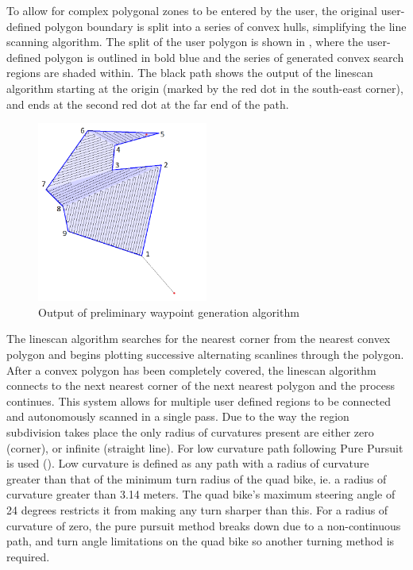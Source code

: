 \documentclass[main.tex]{subfiles}
\begin{document}
To allow for complex polygonal zones to be entered by the user, the original user-defined polygon boundary is split into a series of convex hulls, simplifying the line scanning algorithm. The split of the user polygon is shown in , where the user-defined polygon is outlined in bold blue and the series of generated convex search regions are shaded within. The black path shows the output of the linescan algorithm starting at the origin (marked by the red dot in the south-east corner), and ends at the second red dot at the far end of the path. 
\begin{figure}[ht]
\includegraphics[width=0.5\textwidth]{4-DetailedDesign/lineScanAlgorithm2.png}
\centering
\caption{Output of preliminary waypoint generation algorithm} 
\end{figure}
The linescan algorithm searches for the nearest corner from the nearest convex polygon and begins plotting successive alternating scanlines through the polygon. After a convex polygon has been completely covered, the linescan algorithm connects to the next nearest corner of the next nearest polygon and the process continues. This system allows for multiple user defined regions to be connected and autonomously scanned in a single pass. Due to the way the region subdivision takes place the only radius of curvatures present are either zero (corner), or infinite (straight line).
For low curvature path following Pure Pursuit is used (). Low curvature is defined as any path with a radius of curvature greater than that of the minimum turn radius of the quad bike, ie. a radius of curvature greater than 3.14 meters. The quad bike's maximum steering angle of 24 degrees restricts it from making any turn sharper than this. For a radius of curvature of zero, the pure pursuit method breaks down due to a non-continuous path, and turn angle limitations on the quad bike so another turning method is required.
\end{document}
